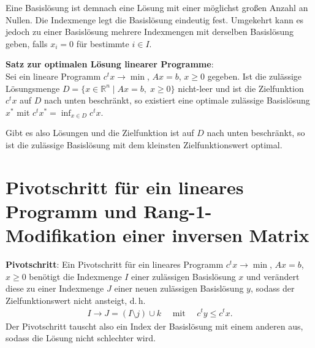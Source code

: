 Eine Basislösung ist demnach eine Lösung mit einer möglichst großen Anzahl
an Nullen.
Die Indexmenge legt die Basislösung eindeutig fest.
Umgekehrt kann es jedoch zu einer Basislösung mehrere Indexmengen mit derselben
Basislösung geben, falls $x_i = 0$ für bestimmte $i \in I$.

\linie

\textbf{Satz zur optimalen Lösung linearer Programme}: \\
Sei ein lineare Programm $c^t x \rightarrow \min$, $Ax = b$, $x \ge 0$
gegeben.
Ist die zulässige Lösungsmenge
$D = \{x \in \mathbb{R}^n \;|\; Ax = b,\; x \ge 0\}$
nicht-leer und ist die Zielfunktion $c^t x$ auf $D$ nach unten beschränkt,
so existiert eine optimale zulässige Basislösung $x^\ast$ mit
$c^t x^\ast = \inf_{x \in D} c^t x$.

Gibt es also Lösungen und die Zielfunktion ist auf $D$ nach unten beschränkt,
so ist die zulässige Basislösung mit dem kleinsten Zielfunktionswert optimal.

\pagebreak

\section{%
    Pivotschritt für ein lineares Programm und Rang-1-Modifikation einer
    inversen Matrix%
}

\textbf{Pivotschritt}:
Ein Pivotschritt für ein lineares Programm $c^t x \rightarrow \min$,
$Ax = b$, $x \ge 0$ benötigt die Indexmenge $I$ einer zulässigen Basislösung
$x$ und verändert diese zu einer Indexmenge $J$ einer neuen zulässigen
Basislösung $y$, sodass der Zielfunktionswert nicht ansteigt, d.\,h.
\begin{align*}
    I \rightarrow J = (I \setminus j) \cup k \quad\text{ mit }\quad
    c^t y \le c^t x.
\end{align*}
Der Pivotschritt tauscht also ein Index der Basislösung mit einem anderen aus,
sodass die Lösung nicht schlechter wird.


